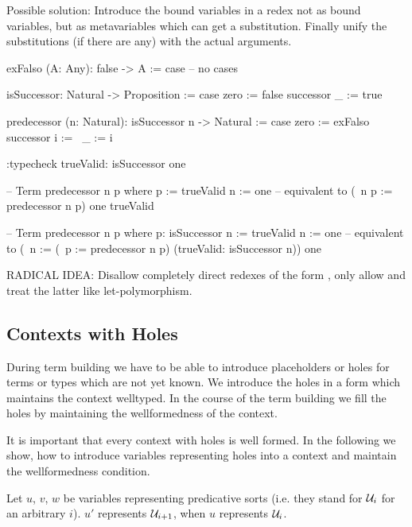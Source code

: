 Possible solution: Introduce the bound variables in a redex not as bound
variables, but as metavariables which can get a substitution. Finally unify the
substitutions (if there are any) with the actual arguments.


\begin{alba}
    exFalso (A: Any): false -> A :=
        case -- no cases

    isSuccessor: Natural -> Proposition :=
        case
            zero        := false
            successor _ := true

    predecessor (n: Natural): isSuccessor n -> Natural :=
        case
            zero :=
                exFalso
            successor i :=
                \ _ := i

    :typecheck trueValid: isSuccessor one


    -- Term
        predecessor n p where
            p := trueValid
            n := one
    -- equivalent to
        (\ n p := predecessor n p) one trueValid

    -- Term
        predecessor n p where
            p: isSuccessor n := trueValid
            n := one
    -- equivalent to
        (\ n := (\ p := predecessor n p) (trueValid: isSuccessor n)) one
\end{alba}


RADICAL IDEA: Disallow completely direct redexes of the form , only allow  and treat the latter like let-polymorphism.








\subsection{Contexts with Holes}

During term building we have to be able to introduce placeholders or holes for
terms or types which are not yet known. We introduce the holes in a form which
maintains the context welltyped. In the course of the term building we fill the
holes by maintaining the wellformedness of the context.

It is important that every context with holes is well formed. In the following
we show, how to introduce variables representing holes into a context and
maintain the wellformedness condition.

Let $u$, $v$, $w$ be variables representing predicative sorts (i.e. they stand
for ${\cal{U}}_i$ for an arbitrary $i$). $u'$ represents ${\cal{U}}_{i+1}$, when $u$
represents ${\cal{U}}_i$.



